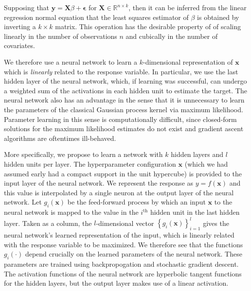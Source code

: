 \documentclass[]{article}
\newcommand{\paren}[1]{\left({#1}\right)}
\newcommand{\set}[1]{\left\{{#1}\right\}}
\newcommand{\R}{\mathbb{R}}
\newcommand{\1}{\mathbf{1}}
\newcommand{\0}{\mathbf{0}}
\newcommand{\x}{\mathbf{x}}
\newcommand{\y}{\mathbf{y}}
\begin{document}
Supposing that $\y = \mathbf{X}\beta + \boldsymbol{\epsilon}$ for $\mathbf{X}\in\R^{n\times k}$, then it can be inferred from the linear regression normal equation that the least squares estimator of $\beta$ is obtained by inverting a $k\times k$ matrix. This operation has the desirable property of of scaling linearly in the number of observations $n$ and cubically in the number of covariates. 

We therefore use a neural network to learn a $k$-dimensional representation of $\x$ which is \textit{linearly} related to the response variable. In particular, we use the last hidden layer of the neural network, which, if learning was successful, can undergo a weighted sum of the activations in each hidden unit to estimate the target. The neural network also has an advantage in the sense that it is unnecessary to learn the parameters of the classical Gaussian process kernel via maximum likelihood. Parameter learning in this sense is computationally difficult, since closed-form solutions for the maximum likelihood estimates do not exist and gradient ascent algorithms are oftentimes ill-behaved.

More specifically, we propose to learn a network with $k$ hidden layers and $l$ hidden units per layer. The hyperparameter configuration $\x$ (which we had assumed early had a compact support in the unit hypercube) is provided to the input layer of the neural network. We represent the response as $y=f\paren{\x}$ and this value is interpolated by a single neuron at the output layer of the neural network. Let $g_i\paren{\x}$ be the feed-forward process by which an input $\x$ to the neural network is mapped to the value in the $i^\text{th}$ hidden unit in the last hidden layer. Taken as a column, the $l$-dimensional vector $\set{g_i\paren{\x}}_{i=1}^l$ gives the neural network's learned representation of the input, which is linearly related with the response variable to be maximized. We therefore see that the functions $g_i\paren{\cdot}$ depend crucially on the learned parameters of the neural network. These parameters are trained using backpropogation and stochastic gradient descent. The activation functions of the neural network are hyperbolic tangent functions for the hidden layers, but the output layer makes use of a linear activation. 
\end{document}
